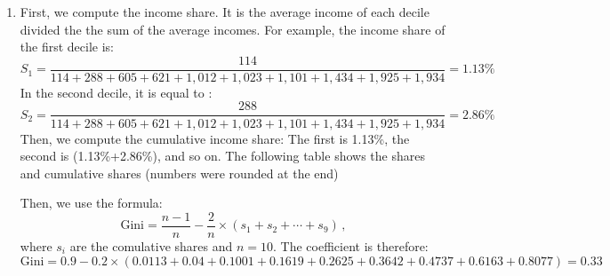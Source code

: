 \documentclass[letterpaper]{article}\usepackage[]{graphicx}\usepackage[]{color}
\numberwithin{exer}{section}
\theoremstyle{nonumberplain}
\begin{document}
\begin{enumerate}
\begin{center}
{}
\end{center}  
Then, we use the formula:
\[
\mathrm{Gini} = 0.8-0.4\times(s_1+s_2+s_3+s_4)\,,
\]
where $s_i$ are the comulative shares. The coefficient is therefore:
\[
\mathrm{Gini} = 0.8-0.4\times(0.0883+0.2542+0.4722+0.728) = 0.18
\]
\item First, we compute the income share. It is the average income of
  each decile divided the the sum of the average incomes. For example,
  the income share of the first decile is:
\footnotesize  
\[
S_1 = \frac{114}{
  114+288+605+621+1,012+1,023+1,101+1,434+1,925+1,934}=
1.13\%
\]
\normalsize
In the second decile, it is equal to :
\footnotesize
\[
S_2 = \frac{288}{
  114+288+605+621+1,012+1,023+1,101+1,434+1,925+1,934}=
2.86\%
\]
\normalsize
Then, we compute the cumulative income share: The first is
1.13\%, the second is
(1.13\%+2.86\%),
and so on. The following table shows the shares and cumulative shares
(numbers were rounded at the end)
\begin{center}  
\end{center}  
Then, we use the formula:
\[
\mathrm{Gini} = \frac{n-1}{n}-\frac{2}{n}\times(s_1+s_2+\cdots+s_{9})\,,
\]
where $s_i$ are the comulative shares and $n=10$. The coefficient is
therefore:
\footnotesize
\[
\mathrm{Gini} = 0.9-0.2\times(0.0113+0.04+0.1001+0.1619+0.2625+0.3642+0.4737+0.6163+0.8077) = 0.33
\]
\normalsize
\end{enumerate}  
\end{document}

